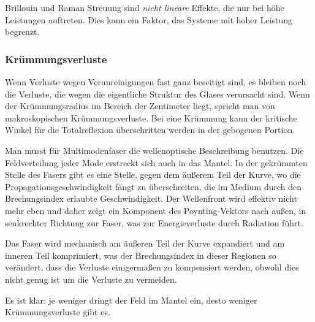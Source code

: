 \documentclass[a4paper]{article}
\begin{document}
Brillouin und Raman Streuung sind \emph{nicht lineare} Effekte, die nur bei höhe
Leistungen auftreten. Dies kann ein Faktor, das Systeme mit hoher Leistung
begrenzt. 



\subsubsection{Krümmungsverluste}
Wenn Verluste wegen Verunreinigungen fast ganz beseitigt sind, es
bleiben noch die Verluste, die wegen die eigentliche Struktur des Glases
verursacht sind.  Wenn der Krümmungsradius im Bereich der Zentimeter liegt,
spricht man von makroskopischen Krümmungsverluste. 
Bei eine Krümmung kann der kritische Winkel für die Totalreflexion
überschritten werden in der gebogenen Portion. 

Man musst für Multimodenfaser die wellenoptische Beschreibung benutzen. Die
Feldverteilung jeder Mode erstreckt sich auch in das Mantel. In der gekrümmten
Stelle des Fasers gibt es eine Stelle, gegen dem äußerem Teil der Kurve, wo die
Propagationsgeschwindigkeit fängt zu überschreiten, die im Medium durch den
Brechungsindex erlaubte Geschwindigkeit. Der Wellenfront wird effektiv nicht
mehr eben und daher zeigt ein Komponent des Poynting-Vektors nach außen, in
senkrechter Richtung zur Faser, was zur Energieverluste durch Radiation führt. 

Das Faser wird mechanisch am äußeren Teil der Kurve expandiert und am inneren
Teil komprimiert, was der Brechungsindex in dieser Regionen so verändert, dass 
die Verluste einigermaßen zu kompensiert werden, obwohl dies nicht genug ist um
die Verluste zu vermeiden.

Es ist klar: je weniger dringt der Feld im Mantel ein, desto weniger
Krümmungsverluste gibt es. 
\end{document}
